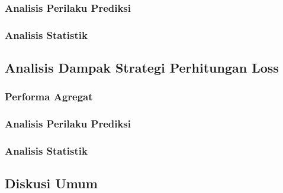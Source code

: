 \subsubsection{Analisis Perilaku Prediksi}
\subsubsection{Analisis Statistik}

\subsection{Analisis Dampak Strategi Perhitungan Loss}
\subsubsection{Performa Agregat}
\subsubsection{Analisis Perilaku Prediksi}
\subsubsection{Analisis Statistik}

\subsection{Diskusi Umum}
